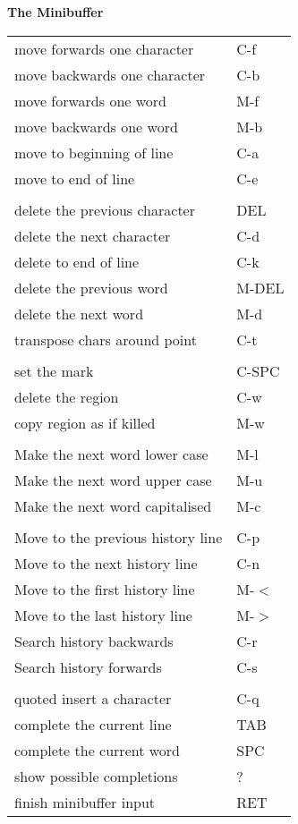 \documentclass[10pt,a4paper,landscape]{article}
\begin{document}
\begin{multicols}{3}
  {\large \textbf{The Minibuffer}}
  \nopagebreak

  \begin{tabular}{p{2.00in}p{0.80in}}
    move forwards one character & C-f \\
    move backwards one character & C-b \\
    move forwards one word & M-f \\
    move backwards one word & M-b \\
    move to beginning of line & C-a \\
    move to end of line & C-e \\
    & \\
    delete the previous character & DEL \\
    delete the next character & C-d \\
    delete to end of line & C-k \\
    delete the previous word & M-DEL \\
    delete the next word & M-d \\
    transpose chars around point & C-t \\
    & \\
    set the mark & C-SPC \\
    delete the region & C-w \\
    copy region as if killed & M-w \\
    & \\
    Make the next word lower case & M-l \\
    Make the next word upper case & M-u \\
    Make the next word capitalised & M-c \\
    & \\
    Move to the previous history line & C-p \\
    Move to the next history line & C-n \\
    Move to the first history line & M-$<$ \\
    Move to the last history line & M-$>$ \\
    Search history backwards & C-r \\
    Search history forwards & C-s \\
    & \\
    quoted insert a character & C-q \\
    complete the current line & TAB \\
    complete the current word & SPC \\
    show possible completions & ? \\
    finish minibuffer input & RET \\
  \end{tabular}
  \vfill


\end{multicols}
\end{document}
